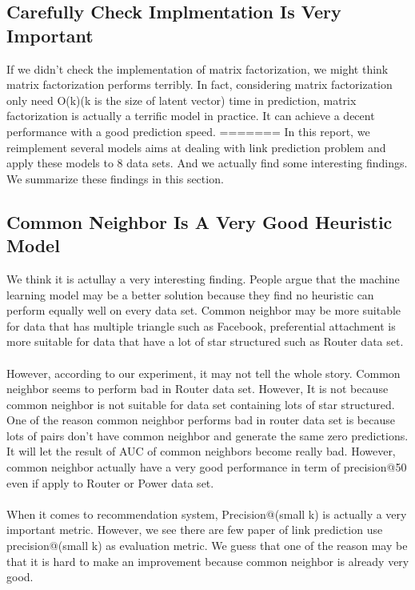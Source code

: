 \documentclass[12pt]{article}
\begin{document}
\subsection{Carefully Check Implmentation Is Very Important}
If we didn't check the implementation of matrix factorization, we might think matrix factorization performs terribly. In fact, considering matrix factorization only need O(k)(k is the size of latent vector) time in prediction, matrix factorization is actually a terrific model in practice. It can achieve a decent performance with a good prediction speed.
=======
In this report, we reimplement several models aims at dealing with link prediction problem and apply these models to 8 data sets. And we actually find some interesting findings. We summarize these findings in this section.

\subsection{Common Neighbor Is A Very Good Heuristic Model}
We think it is actullay a very interesting finding. People argue that the machine learning model may be a better solution because they find no heuristic can perform equally well on every data set. Common neighbor may be more suitable for data that has multiple triangle such as Facebook, preferential attachment is more suitable for data that have a lot of star structured such as Router data set. 
\\ \\
However, according to our experiment, it may not tell the whole story. Common neighbor seems to perform bad in Router data set. However, It is not because common neighbor is not suitable for data set containing lots of star structured. One of the reason common neighbor performs bad in router data set is because lots of pairs don't have common neighbor and generate the same zero predictions. It will let the result of AUC of common neighbors become really bad. However, common neighbor actually have a very good performance in term of precision@50 even if apply to Router or Power data set.
\\ \\
When it comes to recommendation system, Precision@(small k) is actually a very important metric. However, we see there are few paper of link prediction use precision@(small k) as evaluation metric. We guess that one of the reason may be that it is hard to make an improvement because common neighbor is already very good. 
\end{document}
